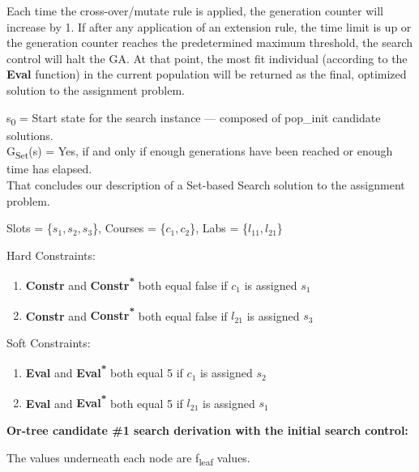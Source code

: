 \documentclass[11pt, oneside]{article}   	%
\begin{document}
\noindent Each time the cross-over/mutate rule is applied, the generation counter will increase by 1. If after any application of an extension rule, the time limit is up or the generation counter reaches the predetermined maximum threshold, the search control will halt the GA. At that point, the most fit individual (according to the \textbf{Eval} function) in the current population will be returned as the final, optimized solution to the assignment problem.


\noindent s\textsubscript{0} = Start state for the search instance --- composed of pop_init candidate solutions.\\
G\textsubscript{Set}(s) = Yes, if and only if enough generations have been reached or enough time has elapsed.\\

\noindent That concludes our description of a Set-based Search solution to the assignment problem.
\newpage


\noindent Slots = \{$s_1, s_2, s_3$\}, Courses = \{$c_1, c_2$\}, Labs = \{$l_{11}, l_{21}$\}

\noindent Hard Constraints:
\begin{enumerate}[topsep=0pt, itemsep=0pt]
\item \textbf{Constr} and \textbf{Constr\textsuperscript{*}} both equal false if $c_1$ is assigned $s_1$
\item \textbf{Constr} and \textbf{Constr\textsuperscript{*}} both equal false if $l_{21}$ is assigned $s_3$
\end{enumerate}

\noindent Soft Constraints:
\begin{enumerate}[topsep=0pt, itemsep=0pt]
\item \textbf{Eval} and \textbf{Eval\textsuperscript{*}} both equal 5 if $c_1$ is assigned $s_2$
\item \textbf{Eval} and \textbf{Eval\textsuperscript{*}} both equal 5 if $l_{21}$ is assigned $s_1$
\end{enumerate}

\noindent \textbf{Or-tree candidate \#1 search derivation with the initial search control:}

\noindent The values underneath each node are f\textsubscript{leaf} values.
\end{document}
